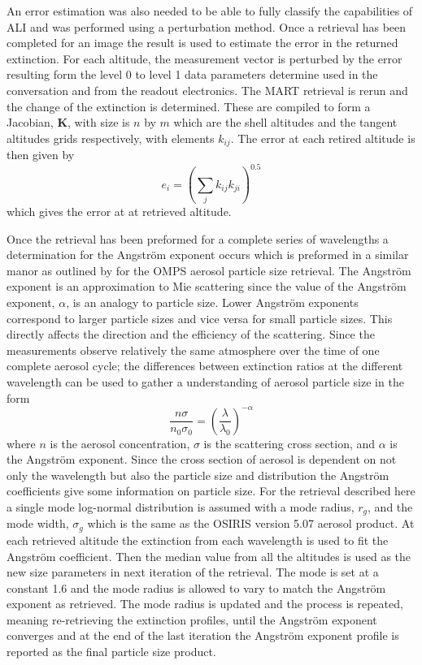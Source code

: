 \documentclass[12pt]{article}
\begin{document}
An error estimation was also needed to be able to fully classify the capabilities of ALI and was performed using a perturbation method. Once a retrieval has been completed for an image the result is used to estimate the error in the returned extinction. For each altitude, the measurement vector is perturbed by the error resulting form the level 0 to level 1 data parameters determine used in the conversation and from the readout electronics. The MART retrieval is rerun and the change of the extinction is determined. These are compiled to form a Jacobian, $\mathbf{K}$, with size is $n$ by $m$ which are the shell altitudes and the tangent altitudes grids respectively, with elements $k_{ij}$. The error at each retired altitude is then given by
\begin{equation}
    e_{i} = \left(\sum_{j}k_{ij}k_{ji}\right)^{0.5}
\end{equation}
which gives the error at at retrieved altitude.

Once the retrieval has been preformed for a complete series of wavelengths a determination for the Angstr\"{o}m exponent occurs which is preformed in a similar manor as outlined by \cite{Rault2013} for the OMPS aerosol particle size retrieval. The Angstr\"{o}m exponent is an approximation to Mie scattering since the value of the Angstr\"{o}m exponent, $\alpha$, is an analogy to particle size. Lower Angstr\"{o}m exponents correspond to larger particle sizes and vice versa for small particle sizes. This directly affects the direction and the efficiency of the scattering. Since the measurements observe relatively the same atmosphere over the time of one complete aerosol cycle; the differences between extinction ratios at the different wavelength can be used to gather a understanding of aerosol particle size in the form
\begin{equation}
    \frac{n\sigma}{n_{0}\sigma_{0}} = \left(\frac{\lambda}{\lambda_{0}}\right)^{-\alpha}
    \label{eqn:agstromCoefficient}
\end{equation}
where $n$ is the aerosol concentration, $\sigma$ is the scattering cross section, and $\alpha$ is the Angstr\"{o}m exponent. Since the cross section of aerosol is dependent on not only the wavelength but also the particle size and distribution the Angstr\"{o}m coefficients give some information on particle size. For the retrieval described here a single mode log-normal distribution is assumed with a mode radius, $r_{g}$, and the mode width, $\sigma_{g}$ which is the same as the OSIRIS version 5.07 aerosol product. At each retrieved altitude the extinction from each wavelength is used to fit the Angstr\"{o}m coefficient. Then the median value from all the altitudes is used as the new size parameters in next iteration of the retrieval. The mode is set at a constant 1.6 and the mode radius is allowed to vary to match the Angstr\"{o}m exponent as retrieved. The mode radius is updated and the process is repeated, meaning re-retrieving the extinction profiles, until the Angstr\"{o}m exponent converges and at the end of the last iteration the Angstr\"{o}m exponent profile is reported as the final particle size product.
\end{document}
